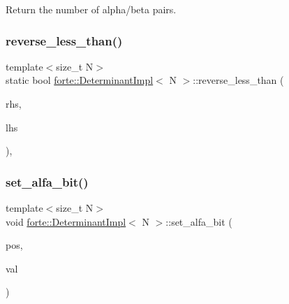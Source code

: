 Return the number of alpha/beta pairs. 

\mbox{\label{classforte_1_1_determinant_impl_a082c139fb3b70315591512bb4d36857f}} 
\subsubsection{\texorpdfstring{reverse\+\_\+less\+\_\+than()}{reverse\_less\_than()}}
{\footnotesize\ttfamily template$<$size\+\_\+t N$>$ \\
static bool \mbox{\hyperlink{classforte_1_1_determinant_impl}{forte\+::\+Determinant\+Impl}}$<$ N $>$\+::reverse\+\_\+less\+\_\+than (\begin{DoxyParamCaption}\item[{const \mbox{\hyperlink{classforte_1_1_determinant_impl}{Determinant\+Impl}}$<$ N $>$ \&}]{rhs,  }\item[{const \mbox{\hyperlink{classforte_1_1_determinant_impl}{Determinant\+Impl}}$<$ N $>$ \&}]{lhs }\end{DoxyParamCaption})\hspace{0.3cm}{\ttfamily [inline]}, {\ttfamily [static]}}

\mbox{\label{classforte_1_1_determinant_impl_aed8c6eaece3cce82a5acf459013b7b23}} 
\subsubsection{\texorpdfstring{set\+\_\+alfa\+\_\+bit()}{set\_alfa\_bit()}}
{\footnotesize\ttfamily template$<$size\+\_\+t N$>$ \\
void \mbox{\hyperlink{classforte_1_1_determinant_impl}{forte\+::\+Determinant\+Impl}}$<$ N $>$\+::set\+\_\+alfa\+\_\+bit (\begin{DoxyParamCaption}\item[{size\+\_\+t}]{pos,  }\item[{bool}]{val }\end{DoxyParamCaption})\hspace{0.3cm}{\ttfamily [inline]}}



